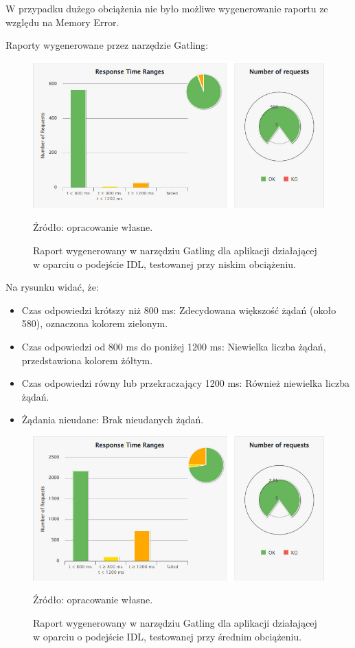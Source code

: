 \documentclass[runningheads,12pt]{llncs}
\begin{document}
W przypadku dużego obciążenia nie było możliwe wygenerowanie raportu ze względu na Memory Error.

\newpage


Raporty wygenerowane przez narzędzie Gatling: 

\begin{figure}
    \includegraphics[width=\linewidth]{images/idl-low-gatling-graph.jpg}
    \caption{Raport wygenerowany w narzędziu Gatling dla aplikacji działającej w oparciu o podejście IDL, testowanej przy niskim obciążeniu.} \label{fig1}
    \vspace{0.5em}
    {\small Źródło: opracowanie własne.}
\end{figure}

Na rysunku widać, że:

\begin{itemize}
    \item Czas odpowiedzi krótszy niż 800 ms: Zdecydowana większość żądań (około 580), oznaczona kolorem zielonym.
    \item Czas odpowiedzi od 800 ms do poniżej 1200 ms: Niewielka liczba żądań, przedstawiona kolorem żółtym.
    \item Czas odpowiedzi równy lub przekraczający 1200 ms: Również niewielka liczba żądań.
    \item Żądania nieudane: Brak nieudanych żądań.
\end{itemize}

\newpage

\begin{figure}
    \includegraphics[width=\linewidth]{images/idl-midle-gatling-graph.jpg}
    \caption{Raport wygenerowany w narzędziu Gatling dla aplikacji działającej w oparciu o podejście IDL, testowanej przy średnim obciążeniu.} \label{fig1}
    \vspace{0.5em}
    {\small Źródło: opracowanie własne.}
\end{figure}
\end{document}
